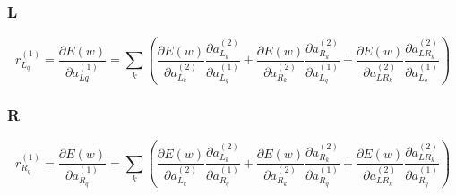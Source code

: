 \documentclass[11pt]{article}
\begin{document}
\subsubsection*{L} 
$$r^{(1)}_{L_q} = \frac{\partial E(w)}{\partial a^{(1)}_{Lq}} =\sum_{k} ( \frac{\partial E(w)}{\partial a^{(2)}_{L_k}} \frac{\partial a^{(2)}_{L_k}}{\partial a^{(1)}_{L_q}} + \frac{\partial E(w)}{\partial a^{(2)}_{R_k}} \frac{\partial a^{(2)}_{R_k}}{\partial a^{(1)}_{L_q}} +  \frac{\partial E(w)}{\partial a^{(2)}_{LR_k}} \frac{\partial a^{(2)}_{LR_k}}{\partial a^{(1)}_{L_q}} )$$

\subsubsection*{R}
$$r^{(1)}_{R_q} = \frac{\partial E(w)}{\partial a^{(1)}_{R_q}} =\sum_{k} ( \frac{\partial E(w)}{\partial a^{(2)}_{L_k}} \frac{\partial a^{(2)}_{L_k}}{\partial a^{(1)}_{R_q}} + \frac{\partial E(w)}{\partial a^{(2)}_{R_k}} \frac{\partial a^{(2)}_{R_k}}{\partial a^{(1)}_{R_q}} +  \frac{\partial E(w)}{\partial a^{(2)}_{LR_k}} \frac{\partial a^{(2)}_{LR_k}}{\partial a^{(1)}_{R_q}} )$$
\end{document}
